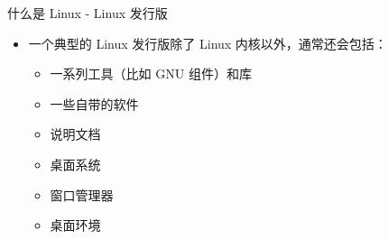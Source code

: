 \documentclass[UTF8]{ctexbeamer}
\begin{document}
\begin{frame}{什么是 Linux - Linux 发行版}
    \begin{itemize}
        \item 一个典型的 Linux 发行版除了 Linux 内核以外，通常还会包括：
        \begin{itemize}
            \item 一系列工具（比如 GNU 组件）和库
            \item 一些自带的软件
            \item 说明文档
            \item 桌面系统
            \item 窗口管理器
            \item 桌面环境
        \end{itemize}
    \end{itemize}
    
\end{frame}
\end{document}
